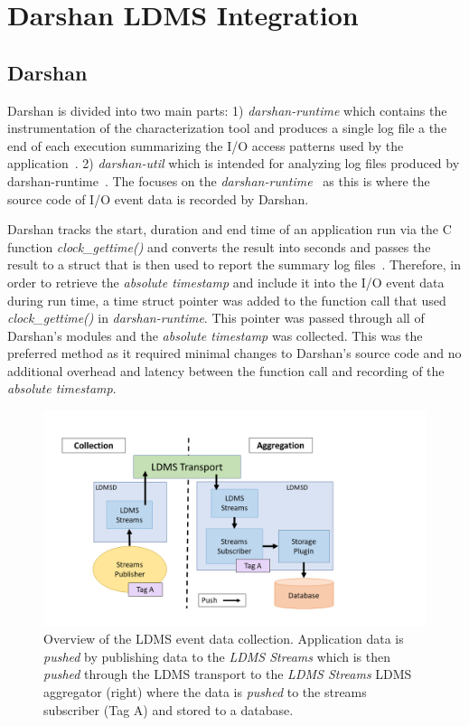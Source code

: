 \section{Darshan LDMS Integration}
\subsection{Darshan}
Darshan is divided into two main parts: 1) \emph{darshan-runtime} which contains the instrumentation of the characterization tool and produces a single log file a the end of each execution summarizing the I/O access patterns used by the application~\cite{darshan-doc}. 2) \emph{darshan-util} which is intended for analyzing log files produced by darshan-runtime~\cite{darshan-doc}. The \Darshan focuses on the \emph{darshan-runtime}~\cite{darshan-runtime} as this is where the source code of I/O event data is recorded by Darshan.

Darshan tracks the start, duration and end time of an application run via the C function \emph{clock\_gettime()} and converts the result into seconds and passes the result to a struct that is then used to report the summary log files~\cite{darshangithub}. Therefore, in order to retrieve the \emph{absolute timestamp} and include it into the I/O event data during run time, a time struct pointer was added to the function call that used \emph{clock\_gettime()} in \emph{darshan-runtime}. This pointer was passed through all of Darshan's modules and the \emph{absolute timestamp} was collected. This was the preferred method as it required minimal changes to Darshan's source code and no additional overhead and latency between the function call and recording of the \emph{absolute timestamp}. 

\begin{figure}
	\centering
	\includegraphics[width=1.2\linewidth]{figs/ldms-overview.png}
	\caption{Overview of the LDMS event data collection. Application data is \emph{pushed} by publishing data to the \emph{LDMS Streams} which is then \emph{pushed} through the LDMS transport to the \emph{LDMS Streams} LDMS aggregator (right) where the data is \emph{pushed} to the streams subscriber (Tag A) and stored to a database.}
	\label{f:CSV Header and Output}
\end{figure}

